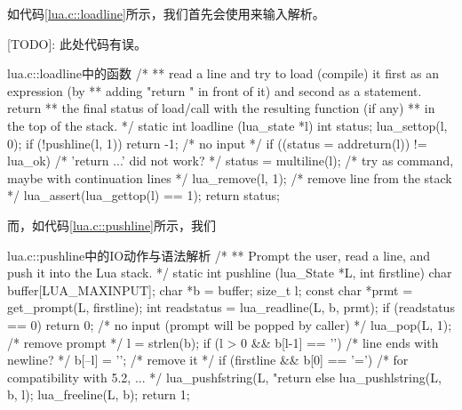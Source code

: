 如代码\ref{lua.c::loadline}所示，我们首先会使用来输入解析。

[TODO]: 此处代码有误。

\begin{ccode}{lua.c::loadline}{中的函数}
/*
** read a line and try to load (compile) it first as an expression (by
** adding "return " in front of it) and second as a statement. return
** the final status of load/call with the resulting function (if any)
** in the top of the stack.
*/
static int loadline (lua_state *l) {
  int status;
  lua_settop(l, 0);
  if (!pushline(l, 1))
    return -1;  /* no input */
  if ((status = addreturn(l)) != lua_ok)  /* 'return ...' did not work? */
    status = multiline(l);  /* try as command, maybe with continuation lines */
  lua_remove(l, 1);  /* remove line from the stack */
  lua_assert(lua_gettop(l) == 1);
  return status;
}
\end{ccode}

而，如代码\ref{lua.c::pushline}所示，我们

\begin{ccode}{lua.c::pushline}{中的IO动作与语法解析}
/*
** Prompt the user, read a line, and push it into the Lua stack.
*/
static int pushline (lua_State *L, int firstline) {
  char buffer[LUA_MAXINPUT];
  char *b = buffer;
  size_t l;
  const char *prmt = get_prompt(L, firstline);
  int readstatus = lua_readline(L, b, prmt);
  if (readstatus == 0)
    return 0;  /* no input (prompt will be popped by caller) */
  lua_pop(L, 1);  /* remove prompt */
  l = strlen(b);
  if (l > 0 && b[l-1] == '\n')  /* line ends with newline? */
    b[--l] = '\0';  /* remove it */
  if (firstline && b[0] == '=')  /* for compatibility with 5.2, ... */
    lua_pushfstring(L, "return %
  else
    lua_pushlstring(L, b, l);
  lua_freeline(L, b);
  return 1;
}
\end{ccode}



